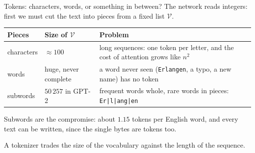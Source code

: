 \documentclass[10pt]{beamer}
\newcommand{\Vocab}{\mathcal{V}}   %
\newcommand{\takeaway}[1]{%
  \par\medskip
  \begin{tcolorbox}[enhanced, colback=ctrl!8, colframe=ctrl, boxrule=0pt, leftrule=2.5pt, arc=0pt,
      left=5pt, right=5pt, top=2.5pt, bottom=2.5pt, before skip=0pt, after skip=0pt]
  \small #1
  \end{tcolorbox}}
\begin{document}
\begin{frame}{Tokens: characters, words, or something in between?}
\small
The network reads \alert{integers}: first we must cut the text into pieces from a fixed list $\Vocab$.

\medskip
\footnotesize
\renewcommand{\arraystretch}{1.4}
\begin{tabularx}{\textwidth}{@{}l l >{\raggedright\arraybackslash}X@{}}
\toprule
\textbf{Pieces} & \textbf{Size of $\Vocab$} & \textbf{Problem} \\
\midrule
characters & $\approx100$ & long sequences: one token per letter, and the cost of attention grows like $n^2$ \\
words & huge, never complete & a word never seen (\texttt{Erlangen}, a typo, a new name) has no token \\
\rowcolor{ctrl!12}\alert{subwords} & $50\,257$ in GPT-2 & frequent words whole, rare words in pieces: \texttt{Er|l|ang|en} \\
\bottomrule
\end{tabularx}

\medskip
\small
Subwords are the compromise: about $1.15$ tokens per English word, and \alert{every} text can be written, since the single bytes are tokens too.
\takeaway{A tokenizer trades the size of the vocabulary against the length of the sequence.}
\end{frame}
\end{document}
